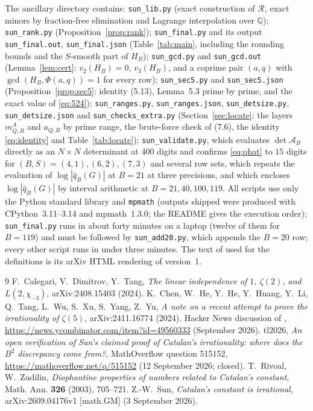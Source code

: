 \documentclass[11pt]{amsart}
\theoremstyle{definition}
\newcommand{\Q}{\mathbb{Q}}
\newcommand{\qhat}{\widehat{q}}
\begin{document}
The ancillary directory contains: \texttt{sun\_lib.py} (exact construction of $\mathcal R$, exact minors by
fraction-free elimination and Lagrange interpolation over $\Q$); \texttt{sun\_rank.py}
(Proposition~\ref{prop:rank}); \texttt{sun\_final.py} and its output \texttt{sun\_final.out}, \texttt{sun\_final.json} (Table~\ref{tab:main}, including the rounding bounds and the $S$-smooth part of $H_B$); \texttt{sun\_gcd.py} and \texttt{sun\_gcd.out} (Lemma~\ref{lem:cert}: $v_2(H_B)=0$, $v_3(H_B)$, and a coprime pair $(a,q)$ with $\gcd(H_B,\Phi(a,q))=1$ for every row); \texttt{sun\_sec5.py} and \texttt{sun\_sec5.json} (Proposition~\ref{prop:sec5}: identity (5.13), Lemma~5.3 prime by prime, and the exact value of \eqref{eq:524}); \texttt{sun\_ranges.py}, \texttt{sun\_ranges.json}, \texttt{sun\_detsize.py}, \texttt{sun\_detsize.json} and \texttt{sun\_checks\_extra.py} (Section~\ref{sec:locate}: the layers $m^A_{Q,B}$ and $a_{Q,B}$ by prime range, the brute-force check of (7.6), the identity \eqref{eq:identity} and Table~\ref{tab:locate}); \texttt{sun\_validate.py}, which evaluates $\det\mathcal A_B$ directly as an
$N\times N$ determinant at $400$ digits and confirms \eqref{eq:qhat} to $15$ digits for
$(B,S)=(4,1),(6,2),(7,3)$ and several row sets, which repeats the evaluation of $\log|\qhat_B(G)|$ at $B=21$ at three precisions, and which encloses $\log|\qhat_B(G)|$ by interval arithmetic at $B=21,40,100,119$. All scripts use only the Python standard library and \texttt{mpmath} (outputs shipped were produced with CPython~3.11--3.14 and mpmath~1.3.0; the README gives the execution order); \texttt{sun\_final.py} runs in about forty minutes on a laptop (twelve of them for $B=119$) and must be followed by \texttt{sun\_add20.py}, which appends the $B=20$ row; every other script runs in under three minutes. The text of \cite{Sun26} used for the definitions is its arXiv
HTML rendering of version~1.

\begin{thebibliography}{9}
 F.~Calegari, V.~Dimitrov, Y.~Tang, \emph{The linear independence of $1$, $\zeta(2)$, and $L(2,\chi_{-3})$}, arXiv:2408.15403 (2024).
 K.~Chen, W.~He, Y.~He, Y.~Huang, Y.~Li, Q.~Tang, L.~Wu, S.~Xu, S.~Yang, Z.~Yu, \emph{A note on a recent attempt to prove the irrationality of $\zeta(5)$}, arXiv:2411.16774 (2024).
 Hacker News discussion of \cite{Sun26}, \url{https://news.ycombinator.com/item?id=49560333} (September 2026).
 tl2026, \emph{An open verification of Sun's claimed proof of Catalan's irrationality: where does the $B^2$ discrepancy come from?}, MathOverflow question 515152, \url{https://mathoverflow.net/q/515152} (12 September 2026; closed).
 T.~Rivoal, W.~Zudilin, \emph{Diophantine properties of numbers related to Catalan's constant}, Math. Ann. \textbf{326} (2003), 705--721.
 Z.-W.~Sun, \emph{Catalan's constant is irrational}, arXiv:2609.04176v1 [math.GM] (3 September 2026).
\end{thebibliography}
\end{document}
